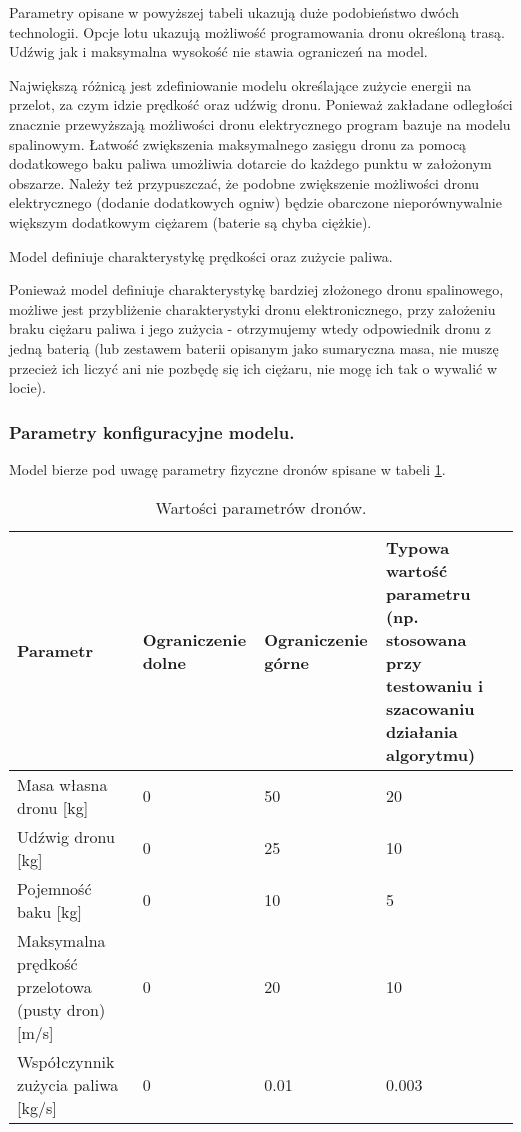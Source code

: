 \documentclass[twoside, 12pt]{article}
\begin{document}
\par Parametry opisane w powyższej tabeli ukazują duże podobieństwo dwóch technologii. Opcje lotu ukazują możliwość programowania dronu określoną trasą. Udźwig jak i maksymalna wysokość nie stawia ograniczeń na model.
\par Największą różnicą jest zdefiniowanie modelu określające zużycie energii na przelot, za czym idzie prędkość oraz udźwig dronu. Ponieważ zakładane odległości znacznie przewyższają możliwości dronu elektrycznego program bazuje na modelu spalinowym. Łatwość zwiększenia maksymalnego zasięgu dronu za pomocą dodatkowego baku paliwa umożliwia dotarcie do każdego punktu w założonym obszarze. Należy też przypuszczać, że podobne zwiększenie możliwości dronu elektrycznego (dodanie dodatkowych ogniw) będzie obarczone nieporównywalnie większym dodatkowym ciężarem (baterie są chyba ciężkie).
\par Model definiuje charakterystykę prędkości oraz zużycie paliwa.
\par Ponieważ model definiuje charakterystykę bardziej złożonego dronu spalinowego, możliwe jest przybliżenie charakterystyki dronu elektronicznego, przy założeniu braku ciężaru paliwa i jego zużycia - otrzymujemy wtedy odpowiednik dronu z jedną baterią (lub zestawem baterii opisanym jako sumaryczna masa, nie muszę przecież ich liczyć ani nie pozbędę się ich ciężaru, nie mogę ich tak o wywalić w locie).



\subsubsection{Parametry konfiguracyjne modelu.}
\par Model bierze pod uwagę parametry fizyczne dronów spisane w tabeli \ref{tab:parametry_dronow}.

\begin{table}[h]
	\centering
	\begin{tabular}{|l|l|l|l|}
		\hline Parametr & Ograniczenie dolne & Ograniczenie górne & Typowa wartość parametru (np. stosowana przy testowaniu i szacowaniu działania algorytmu)\\
		\hline Masa własna dronu [kg] & 0 & 50 & 20\\
		\hline Udźwig dronu [kg] & 0 & 25 & 10\\
		\hline Pojemność baku [kg] & 0 & 10 & 5\\
		\hline Maksymalna prędkość przelotowa (pusty dron) [m/s] & 0 & 20 & 10\\
		\hline Współczynnik zużycia paliwa [kg/s] & 0 & 0.01 & 0.003\\
		\hline
	\end{tabular}
	\caption{Wartości parametrów dronów.\label{tab:parametry_dronow}}
\end{table}
\end{document}
